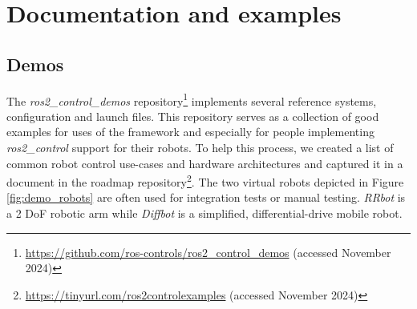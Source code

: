 \documentclass[journal]{IEEEtran}
\begin{document}


\section{Documentation and examples}


\subsection{Demos}

The \emph{ros2\_control\_demos} repository\footnote{\url{https://github.com/ros-controls/ros2\_control\_demos} (accessed November 2024)} implements several reference systems, configuration and launch files.
This repository serves as a collection of good examples for uses of the framework and especially for people implementing \emph{ros2\_control} support for their robots. To help this process, we created a list of common robot control use-cases and hardware architectures and captured it in a document in the roadmap repository\footnote{\url{https://tinyurl.com/ros2controlexamples} (accessed November 2024)}.
The two virtual robots depicted in Figure \ref{fig:demo_robots} are often used for integration tests or manual testing. \emph{RRbot} is a 2 DoF robotic arm while \emph{Diffbot} is a simplified, differential-drive mobile robot.
\end{document}
